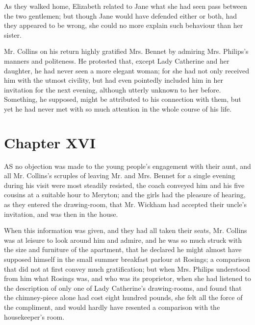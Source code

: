 \documentclass[12pt,openright]{book}
\begin{document}
As they walked home, Elizabeth related to Jane what she had seen pass between the two gentlemen; but though Jane would have defended either or both, had they appeared to be wrong, she could no more explain such behaviour than her sister.

Mr. Collins on his return highly gratified Mrs. Bennet by admiring Mrs. Philips’s manners and politeness. He protested that, except Lady Catherine and her daughter, he had never seen a more elegant woman; for she had not only received him with the utmost civility, but had even pointedly included him in her invitation for the next evening, although utterly unknown to her before. Something, he supposed, might be attributed to his connection with them, but yet he had never met with so much attention in the whole course of his life.

\chapter{Chapter XVI}

\noindent  AS no objection was made to the young people’s engagement with their aunt, and all Mr. Collins’s scruples of leaving Mr. and Mrs. Bennet for a single evening during his visit were most steadily resisted, the coach conveyed him and his five cousins at a suitable hour to Meryton; and the girls had the pleasure of hearing, as they entered the drawing-room, that Mr. Wickham had accepted their uncle’s invitation, and was then in the house.

When this information was given, and they had all taken their seats, Mr. Collins was at leisure to look around him and admire, and he was so much struck with the size and furniture of the apartment, that he declared he might almost have supposed himself in the small summer breakfast parlour at Rosings; a comparison that did not at first convey much gratification; but when Mrs. Philips understood from him what Rosings was, and who was its proprietor, when she had listened to the description of only one of Lady Catherine’s drawing-rooms, and found that the chimney-piece alone had cost eight hundred pounds, she felt all the force of the compliment, and would hardly have resented a comparison with the housekeeper’s room.
\end{document}
